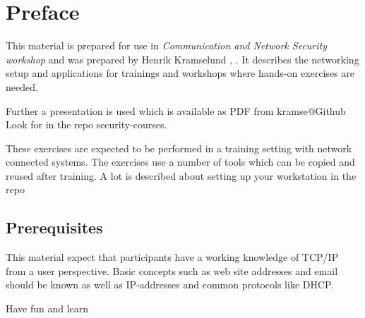 \documentclass[a4paper,11pt,notitlepage]{report}
\begin{document}
\rm
{}
\newcommand{\subject}[1]{Communication and Network Security workshop}

\setcounter{tocdepth}{0}

{\color{titlecolor}
\renewcommand{\baselinestretch}{0.3}\setlength{\parskip}{1mm}
\tableofcontents}

\normal
\pagestyle{fancyplain}
\chapter*{\color{titlecolor}Preface}

This material is prepared for use in \emph{Communication and Network Security workshop} and was prepared by
Henrik Kramselund  ,  .
It describes the networking setup and
applications for trainings and workshops where hands-on exercises are needed.

\vskip 1cm
Further a presentation is used which is available as PDF from kramse@Github\\
Look for \jobname in the repo security-courses.

These exercises are expected to be performed in a training setting with network connected systems. The exercises use a number of tools which can be copied and reused after training. A lot is described about setting up your workstation in the repo




\section*{\color{titlecolor}Prerequisites}

This material expect that participants have a working knowledge of
TCP/IP from a user perspective. Basic concepts such as web site addresses and email should be known as well as IP-addresses and common protocols like DHCP.

\vskip 1cm
Have fun and learn
\eject

\rhead{\fancyplain{}{\bf \chaptername\ \thechapter}}

\end{document}
